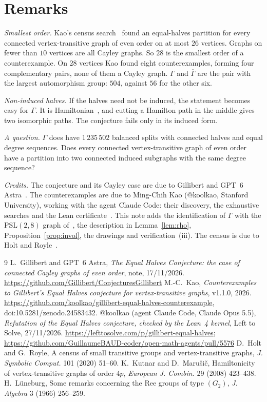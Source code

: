 \documentclass[11pt,a4paper]{article}
\theoremstyle{definition}
\newcommand{\PSL}{\mathrm{PSL}}
\begin{document}
\section{Remarks}

\emph{Smallest order.} Kao's census search~\cite{K} found an equal-halves partition
for every connected vertex-transitive graph of even order on at most $26$
vertices. Graphs on fewer than $10$ vertices are all Cayley graphs. So $28$ is
the smallest order of a counterexample. On $28$ vertices Kao found eight
counterexamples, forming four complementary pairs, none of them a Cayley
graph. $\Gamma$ and $\overline\Gamma$ are the pair with the largest automorphism
group: $504$, against $56$ for the other six.

\emph{Non-induced halves.} If the halves need not be induced, the statement
becomes easy for $\Gamma$. It is Hamiltonian~\cite{KM}, and cutting a Hamilton
path in the middle gives two isomorphic paths. The conjecture fails only in its
induced form.

\emph{A question.} $\Gamma$ does have $1\,235\,502$ balanced splits with
connected halves and equal degree sequences. Does every connected
vertex-transitive graph of even order have a partition into two connected
induced subgraphs with the same degree sequence?

\emph{Credits.} The conjecture and its Cayley case are due to Gillibert and GPT~6
Astra~\cite{G}. The counterexamples are due to Ming-Chih Kao (@koolkao,
Stanford University), working with the agent Claude Code: their discovery, the
exhaustive searches and the Lean certificate~\cite{K,LtS}. This note adds the
identification of $\Gamma$ with the $\PSL(2,8)$ graph of~\cite{KM}, the
description in Lemma~\ref{lem:rho}, Proposition~\ref{prop:invol}, the drawings
and verification~(iii). The census is due to Holt and Royle~\cite{HR}.

\begin{thebibliography}{9}\small\itemsep0pt
 L.~Gillibert and GPT~6 Astra, \emph{The Equal Halves Conjecture:
  the case of connected Cayley graphs of even order}, note, 17/11/2026.
  \url{https://github.com/Gillibert/ConjecturesGillibert}
 M.-C.~Kao, \emph{Counterexamples to Gillibert's Equal Halves
  conjecture for vertex-transitive graphs}, v1.1.0, 2026.
  \url{https://github.com/koolkao/gillibert-equal-halves-counterexample},
  doi:10.5281/zenodo.24583432.
 @koolkao (agent Claude Code, Claude Opus 5.5), \emph{Refutation of the
  Equal Halves conjecture, checked by the Lean~4 kernel}, Left to Solve,
  27/11/2026. \url{https://lefttosolve.com/p/gillibert-equal-halves};
  \url{https://github.com/GuillaumeBAUD-coder/open-math-agents/pull/5576}
 D.~Holt and G.~Royle, A census of small transitive groups and
  vertex-transitive graphs, \emph{J. Symbolic Comput.} 101 (2020) 51--60.
 K.~Kutnar and D.~Marušič, Hamiltonicity of vertex-transitive
  graphs of order $4p$, \emph{European J. Combin.} 29 (2008) 423--438.
 H.~Lüneburg, Some remarks concerning the Ree groups of type
  $(G_2)$, \emph{J. Algebra} 3 (1966) 256--259.
\end{thebibliography}
\end{document}
